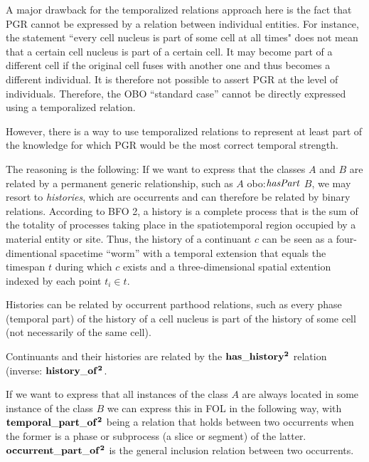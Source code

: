 A major drawback for the temporalized relations approach here is the fact that PGR cannot be expressed by a relation between individual entities. For instance, the statement ``every cell nucleus is part of some cell at all times" does not mean that a certain cell nucleus is part of a certain cell. It may become part of a different cell if the original cell fuses with another one and thus becomes a different individual. It is therefore not possible to assert PGR at the level of individuals. Therefore, the OBO ``standard case'' cannot be directly expressed using a temporalized relation.

However, there is a way to use temporalized relations to represent at least part of the knowledge for which PGR would be the most correct temporal strength.

The reasoning is the following: If we want to express that the classes $A$ and $B$ are related by a permanent generic relationship, such as $A$ obo:$\mathit{hasPart}$ $B$, we may resort to \emph{histories}, which are occurrents and can therefore be related by binary relations. According to BFO 2, a history is a complete process that is the sum of the totality of processes taking place in the spatiotemporal region occupied by a material entity or site. Thus, the history of a continuant $c$ can be seen as a four-dimentional spacetime ``worm'' with a temporal extension that equals the timespan $t$ during which $c$ exists and a three-dimensional spatial extention indexed by each point $t_i \in t$. 

Histories can be related by occurrent parthood relations, such as every phase (temporal part) of the history of a cell nucleus is part of the history of some cell (not necessarily of the same cell).  

Continuants and their histories are related by the $\mathrm{\mathbf{has\_history^2}}$ relation (inverse: $\mathrm{\mathbf{history\_of^2}}$.

If we want to express that all instances of the class $A$ are always located in some instance of the class $B$ we can express this in FOL in the following way, with $\mathrm{\mathbf{temporal\_part\_of^2}}$ being a relation that holds between two occurrents when the former is a phase or subprocess (a slice or segment) of the latter. $\mathrm{\mathbf{occurrent\_part\_of^2}}$ is the general inclusion relation between two occurrents. 


